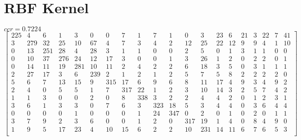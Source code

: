 \documentclass[a4paper, 11pt]{article}
\begin{document}
\section{RBF Kernel}
$ccr=0.7224$
\[\begin{bmatrix}
   225  &   4  &   6  &   1   &  3  &   0 &    0  &   7  &   1  &   7  &   1 &    0  &   3  &  23  &   6  &  21  &   3  &  22  &   7  &  41 \\
     3  & 279  &  32  &  25   & 10  &  67 &    4  &   7  &   3  &   4  &   2 &   12  &  25  &  22  &  12  &   9  &   9  &   4  &   1  &  10 \\
     0  &  13  & 251  &  28   &  4  &  28 &    3  &   1  &   1  &   0  &   0 &    2  &   5  &   0  &   1  &   3  &   1  &   1  &   0  &   0 \\
     0  &  10  &  37  & 276   & 24  &  12 &   17  &   3  &   0  &   0  &   1 &    3  &  26  &   1  &   2  &   0  &   2  &   2  &   0  &   1 \\
     0  &  14  &  11  &  19   &281  &  10 &   11  &   2  &   4  &   2  &   2 &    6  &  18  &   3  &   5  &   0  &   3  &   1  &   1  &   1 \\
     2  &  27  &  17  &   3   &  6  & 239 &    2  &   1  &   2  &   1  &   2 &    5  &   7  &   5  &   8  &   2  &   2  &   2  &   2  &   0 \\
     5  &   6  &   7  &  13   & 15  &   9 &  315  &  17  &   6  &   9  &   6 &    8  &  11  &  17  &   4  &   9  &   3  &   4  &   9  &   2 \\
     2  &   4  &   0  &   5   &  5  &   1 &    7  & 317  &  22  &   1  &   2 &    3  &  10  &  14  &   3  &   2  &   5  &   7  &   4  &   2 \\
     1  &   1  &   3  &   0   &  0  &   2 &    0  &   8  & 338  &   3  &   2 &    2  &   4  &   4  &   2  &   0  &   1  &   2  &   3  &   1 \\
     3  &   6  &   1  &   3   &  3  &   0 &    7  &   6  &   3  & 323  &  18 &    5  &   3  &   4  &   4  &   0  &   3  &   6  &   4  &   4 \\
     0  &   0  &   0  &   0   &  1  &   0 &    0  &   0  &   1  &  24  & 347 &    0  &   2  &   0  &   1  &   0  &   2  &   0  &   1  &   1 \\
     3  &   7  &   9  &   2   &  3  &   6 &    0  &   0  &   1  &   2  &   0 &  317  &  19  &   1  &   4  &   0  &   8  &   4  &   9  &   0 \\
     1  &   9  &   5  &  17   & 23  &   4 &   10  &  15  &   6  &   2  &   2 &   10  & 231  &  14  &  11  &   6  &   7  &   6  &   5  &   3 \\

\end{bmatrix}\]
\end{document}
